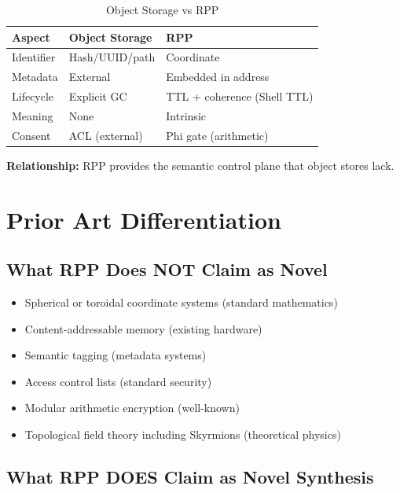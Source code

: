 \documentclass[11pt,a4paper]{article}
\begin{document}
\begin{table}[h]
\centering
\begin{tabular}{lll}
\toprule
\textbf{Aspect} & \textbf{Object Storage} & \textbf{RPP} \\
\midrule
Identifier & Hash/UUID/path & Coordinate \\
Metadata & External & Embedded in address \\
Lifecycle & Explicit GC & TTL + coherence (Shell TTL) \\
Meaning & None & Intrinsic \\
Consent & ACL (external) & Phi gate (arithmetic) \\
\bottomrule
\end{tabular}
\caption{Object Storage vs RPP}
\end{table}

\textbf{Relationship:} RPP provides the semantic control plane that object stores lack.

\section{Prior Art Differentiation}

\subsection{What RPP Does NOT Claim as Novel}

\begin{itemize}
    \item Spherical or toroidal coordinate systems (standard mathematics)
    \item Content-addressable memory (existing hardware)
    \item Semantic tagging (metadata systems)
    \item Access control lists (standard security)
    \item Modular arithmetic encryption (well-known)
    \item Topological field theory including Skyrmions (theoretical physics)
\end{itemize}

\subsection{What RPP DOES Claim as Novel Synthesis}
\end{document}
